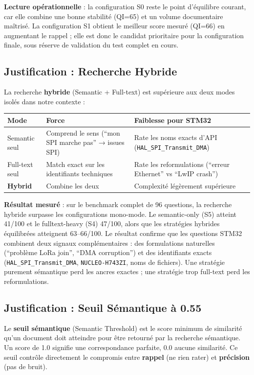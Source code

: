 \textbf{Lecture opérationnelle} : la configuration S0 reste le point d'équilibre courant, car elle combine une bonne stabilité (QI=65) et un volume documentaire maîtrisé. La configuration S1 obtient le meilleur score mesuré (QI=66) en augmentant le rappel ; elle est donc le candidat prioritaire pour la configuration finale, sous réserve de validation du test complet en cours.

\subsection{Justification : Recherche Hybride}

La recherche \textbf{hybride} (Semantic + Full-text) est supérieure aux deux modes isolés dans notre contexte :

\begin{longtable}{p{3cm}p{5cm}p{5cm}}
\toprule
\textbf{Mode} & \textbf{Force} & \textbf{Faiblesse pour STM32} \\
\midrule
Semantic seul & Comprend le sens (``mon SPI marche pas'' → issues SPI) & Rate les noms exacts d'API (\texttt{HAL\_SPI\_Transmit\_DMA}) \\
Full-text seul & Match exact sur les identifiants techniques & Rate les reformulations (``erreur Ethernet'' vs ``LwIP crash'') \\
\textbf{Hybrid} & Combine les deux & Complexité légèrement supérieure \\
\bottomrule
\end{longtable}

\textbf{Résultat mesuré} : sur le benchmark complet de 96 questions, la recherche hybride surpasse les configurations mono-mode. Le semantic-only (S5) atteint 41/100 et le fulltext-heavy (S4) 47/100, alors que les stratégies hybrides équilibrées atteignent 63--66/100. Le résultat confirme que les questions STM32 combinent deux signaux complémentaires : des formulations naturelles (``problème LoRa join'', ``DMA corruption'') et des identifiants exacts (\texttt{HAL\_SPI\_Transmit\_DMA}, \texttt{NUCLEO-H743ZI}, noms de fichiers). Une stratégie purement sémantique perd les ancres exactes ; une stratégie trop full-text perd les reformulations.

\subsection{Justification : Seuil Sémantique à 0.55}
\label{sec:seuil_semantique}

Le \textbf{seuil sémantique} (Semantic Threshold) est le score minimum de similarité qu'un document doit atteindre pour être retourné par la recherche sémantique. Un score de 1.0 signifie une correspondance parfaite, 0.0 aucune similarité. Ce seuil contrôle directement le compromis entre \textbf{rappel} (ne rien rater) et \textbf{précision} (pas de bruit).

